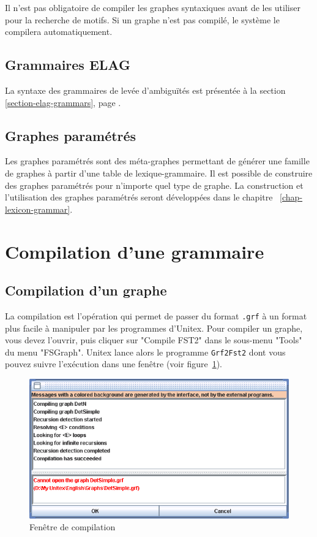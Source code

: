 \bigskip
\noindent Il n’est pas obligatoire de compiler les graphes syntaxiques avant de les utiliser pour la
recherche de motifs. Si un graphe n’est pas compilé, le système le compilera automatiquement.


\subsection{Grammaires ELAG}

La syntaxe des grammaires de levée d’ambiguïtés est présentée à la section \ref{section-elag-grammars},
page \pageref{section-elag-grammars}.


\subsection{Graphes paramétrés}
Les graphes paramétrés sont des méta-graphes permettant de générer une famille de
graphes à partir d’une table de lexique-grammaire. Il est possible de construire des graphes
paramétrés pour n’importe quel type de graphe. La construction et l’utilisation des graphes
paramétrés seront développées dans le chapitre
~\ref{chap-lexicon-grammar}.

\section{Compilation d'une grammaire}
\label{section-graph-compilation}
\subsection{Compilation d'un graphe}
La compilation est l’opération qui permet de passer du format \verb+.grf+ à un format plus
facile à manipuler par les programmes d’Unitex. Pour compiler un graphe, vous devez
l’ouvrir, puis cliquer sur "Compile FST2" dans le sous-menu "Tools" du menu "FSGraph".
Unitex lance alors le programme \verb+Grf2Fst2+ dont vous pouvez suivre l’exécution dans une fenêtre
(voir figure~\ref{fig-compilation-frame}).

\bigskip
\begin{figure}[!h]
\begin{center}
\includegraphics[width=14.7cm]{resources/img/fig6-4.png}
\caption{Fenêtre de compilation\label{fig-compilation-frame}}
\end{center}
\end{figure}

